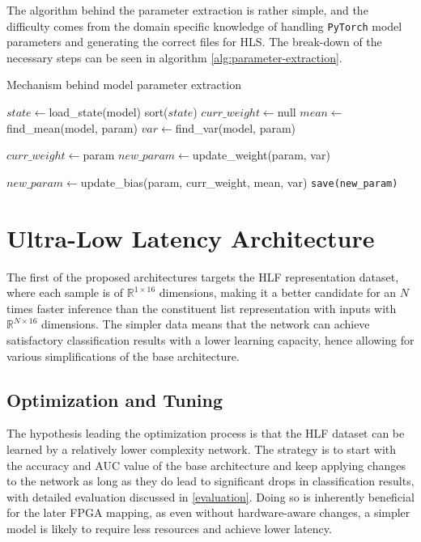 The algorithm behind the parameter extraction is rather simple, and the difficulty comes from the domain specific knowledge of handling \texttt{PyTorch} model parameters and generating the correct files for HLS. The break-down of the necessary steps can be seen in algorithm \ref{alg:parameter-extraction}.

\begin{algorithm}
  \caption{Mechanism behind model parameter extraction}\label{alg:parameter-extraction}
  \begin{algorithmic}[1]
    \State $state \gets $load\_state(model)
    \State sort($state$)
    \State $curr\_weight \gets $null
      \State $mean \gets $find\_mean(model, param)
      \State $var \gets $find\_var(model, param)

        \State $curr\_weight \gets $param
        \State $new\_param \gets $update\_weight(param, var)

      \Else
        
        \State $new\_param \gets $update\_bias(param, curr\_weight, mean, var)
      \EndIf
      \State \texttt{save(new\_param)}
    \EndFor
  \end{algorithmic}
\end{algorithm}



\section{Ultra-Low Latency Architecture}
The first of the proposed architectures targets the HLF representation dataset, where each sample is of \(\mathbb{R}^{1 \times 16}\) dimensions, making it a better candidate for an \(N\) times faster inference than the constituent list representation with inputs with \(\mathbb{R}^{N \times 16}\) dimensions. The simpler data means that the network can achieve satisfactory classification results with a lower learning capacity, hence allowing for various simplifications of the base architecture.

\subsection{Optimization and Tuning}
The hypothesis leading the optimization process is that the HLF dataset can be learned by a relatively lower complexity network. The strategy is to start with the accuracy and AUC value of the base architecture and keep applying changes to the network as long as they do lead to significant drops in classification results, with detailed evaluation discussed in 
\cref{evaluation}. Doing so is inherently beneficial for the later FPGA mapping, as even without hardware-aware changes, a simpler model is likely to require less resources and achieve lower latency.


